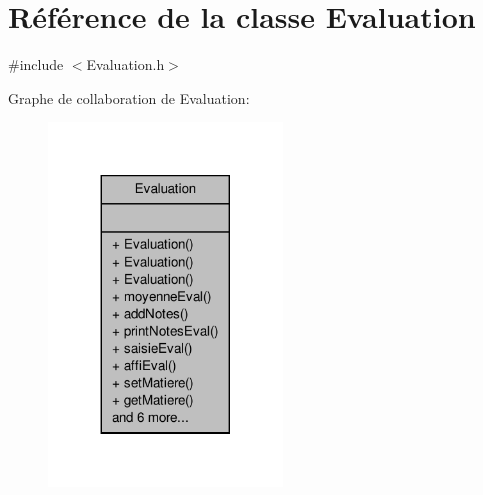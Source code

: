 \hypertarget{class_evaluation}{\section{Référence de la classe Evaluation}
\label{class_evaluation}
}


{\ttfamily \#include $<$Evaluation.\-h$>$}



Graphe de collaboration de Evaluation\-:
\nopagebreak
\begin{figure}[H]
\begin{center}
\leavevmode
\includegraphics[width=176pt]{class_evaluation__coll__graph}
\end{center}
\end{figure}
